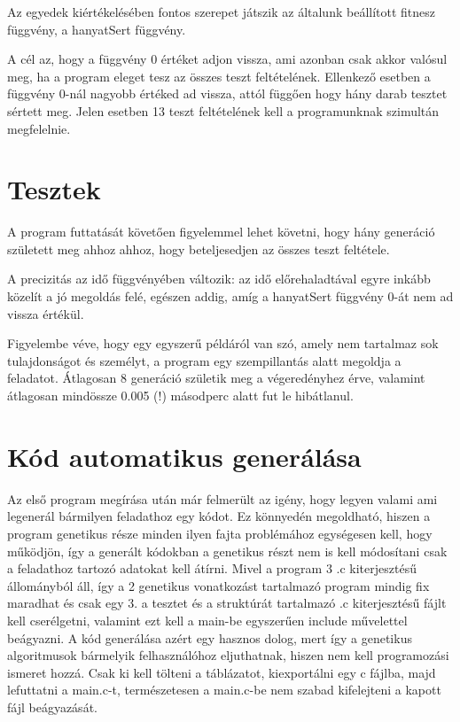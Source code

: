 \documentclass[12ppt,a4paper,oneside]{report}
\begin{document}
	Az egyedek kiértékelésében fontos szerepet játszik az általunk beállított fitnesz függvény, a hanyatSert függvény.


	{A cél az, hogy a függvény 0 értéket adjon vissza, ami azonban csak akkor valósul meg, ha a program eleget tesz az összes teszt feltételének.}
	Ellenkező esetben a függvény 0-nál nagyobb értéked ad vissza, attól függően hogy hány darab tesztet sértett meg.
	Jelen esetben 13 teszt feltételének kell a programunknak szimultán megfelelnie.

	

\chapter{Tesztek} %
	A program futtatását követően figyelemmel lehet követni, hogy hány generáció született meg ahhoz ahhoz, hogy beteljesedjen az összes teszt feltétele.


	A precizitás az idő függvényében változik: az idő előrehaladtával egyre inkább közelít a jó megoldás felé, egészen addig, amíg a hanyatSert függvény 0-át nem ad vissza értékül.


	Figyelembe véve, hogy egy egyszerű példáról van szó, amely nem tartalmaz sok tulajdonságot és személyt, a program egy szempillantás alatt megoldja a feladatot.
	Átlagosan 8 generáció születik meg a végeredényhez érve, valamint átlagosan mindössze 0.005 (!) másodperc alatt fut le hibátlanul.

\chapter{Kód automatikus generálása} %
    Az első program megírása után már felmerült az igény, hogy legyen valami ami legenerál bármilyen feladathoz egy kódot.
    Ez könnyedén megoldható, hiszen a program genetikus része minden ilyen fajta problémához egységesen kell, hogy működjön, így a generált kódokban a genetikus részt nem is kell módosítani csak a feladathoz tartozó adatokat kell átírni.
    Mivel a program 3 .c kiterjesztésű állományból áll, így a 2 genetikus vonatkozást tartalmazó program mindig fix maradhat és csak egy 3. a tesztet és a struktúrát tartalmazó .c kiterjesztésű fájlt kell cserélgetni, valamint ezt kell a main-be egyszerűen include művelettel beágyazni.
    A kód generálása azért egy hasznos dolog, mert így a genetikus algoritmusok bármelyik felhasználóhoz eljuthatnak, hiszen nem kell programozási ismeret hozzá.
    Csak ki kell tölteni a táblázatot, kiexportálni egy c fájlba, majd lefuttatni a main.c-t, természetesen a main.c-be nem szabad kifelejteni a kapott fájl beágyazását.
    
\end{document}

